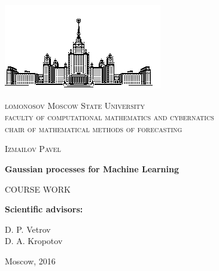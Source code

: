 \begin{titlepage}
  \centering
  \includegraphics{pictures/msu.jpg}\par\vspace{1cm}
  {\scshape lomonosov Moscow State University\\ faculty of computational mathematics and cybernatics\\ chair of mathematical methods of forecasting \par}
  \vspace{2cm}
  {\scshape\large Izmailov Pavel\par}
  \vspace{1cm}
  {\LARGE\bfseries Gaussian processes for Machine Learning\par}
  \vspace{1.5cm}
  {\scshape COURSE WORK\par}
  \vfill

  \raggedleft
  
  {\bf Scientific advisors:}\par
  D. P. Vetrov\\
  D. A. Kropotov
  
  \vfill
  {\center\large Moscow, 2016\par}
\end{titlepage}

